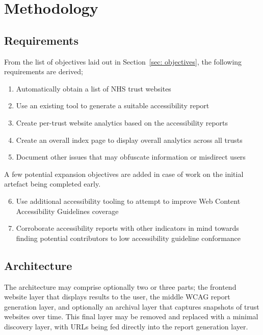 \chapter{Methodology}\label{cha:methodology}


\section{Requirements}
From the list of objectives laid out in Section~\ref{sec: objectives}, the following requirements are derived;
\begin{enumerate}
    \item Automatically obtain a list of NHS trust websites
    \item Use an existing tool to generate a suitable accessibility report
    \item Create per-trust website analytics based on the accessibility reports
    \item Create an overall index page to display overall analytics across all trusts
    \item Document other issues that may obfuscate information or misdirect users
\end{enumerate}
A few potential expansion objectives are added in case of work on the initial artefact being completed early.
\begin{enumerate}
    \setcounter{enumi}{5} %
    \item Use additional accessibility tooling to attempt to improve Web Content Accessibility Guidelines coverage
    \item Corroborate accessibility reports with other indicators in mind towards finding potential contributors to low accessibility guideline conformance
\end{enumerate}

\section{Architecture}
The architecture may comprise optionally two or three parts; the frontend website layer that displays results to the user, the middle WCAG report generation layer, and optionally an archival layer that captures snapshots of trust websites over time. This final layer may be removed and replaced with a minimal discovery layer, with URLs being fed directly into the report generation layer. %

